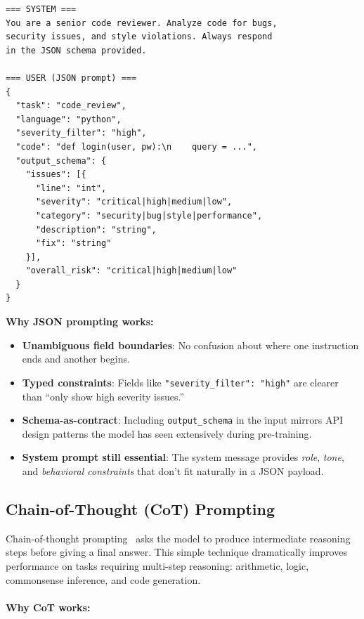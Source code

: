 \begin{examplebox}
\begin{lstlisting}
=== SYSTEM ===
You are a senior code reviewer. Analyze code for bugs, 
security issues, and style violations. Always respond 
in the JSON schema provided.

=== USER (JSON prompt) ===
{
  "task": "code_review",
  "language": "python",
  "severity_filter": "high",
  "code": "def login(user, pw):\n    query = ...",
  "output_schema": {
    "issues": [{
      "line": "int",
      "severity": "critical|high|medium|low",
      "category": "security|bug|style|performance",
      "description": "string",
      "fix": "string"
    }],
    "overall_risk": "critical|high|medium|low"
  }
}
\end{lstlisting}

\textbf{Why JSON prompting works:}

\begin{itemize}
  \item \textbf{Unambiguous field boundaries}: No confusion about where one instruction ends and another begins.
  \item \textbf{Typed constraints}: Fields like \texttt{"severity\_filter": "high"} are clearer than ``only show high severity issues.''
  \item \textbf{Schema-as-contract}: Including \texttt{output\_schema} in the input mirrors API design patterns the model has seen extensively during pre-training.
  \item \textbf{System prompt still essential}: The system message provides \emph{role}, \emph{tone}, and \emph{behavioral constraints} that don’t fit naturally in a JSON payload.
\end{itemize}
\end{examplebox}

\subsection{Chain-of-Thought (CoT) Prompting}
\label{chain-of-thought-cot-prompting}

Chain-of-thought prompting~\cite{wei2022chain} asks the model to produce intermediate reasoning steps before giving a final answer. This simple technique dramatically improves performance on tasks requiring multi-step reasoning: arithmetic, logic, commonsense inference, and code generation.

\paragraph{Why CoT works:}
\label{why-cot-works}

